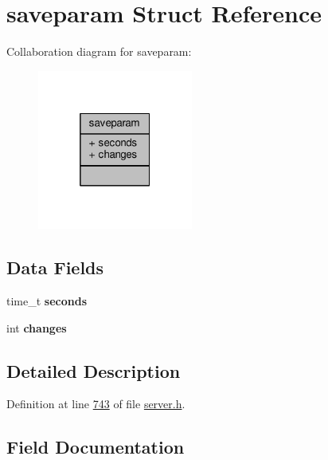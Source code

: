 \hypertarget{structsaveparam}{}\section{saveparam Struct Reference}
\label{structsaveparam}


Collaboration diagram for saveparam\+:\nopagebreak
\begin{figure}[H]
\begin{center}
\leavevmode
\includegraphics[width=145pt]{structsaveparam__coll__graph}
\end{center}
\end{figure}
\subsection*{Data Fields}
\begin{DoxyCompactItemize}
\item 
\mbox{\label{structsaveparam_af19a8ec632e45d50c08f9c4f641779c2}} 
time\+\_\+t {\bfseries seconds}
\item 
\mbox{\label{structsaveparam_af4b8df22183584608986533471082698}} 
int {\bfseries changes}
\end{DoxyCompactItemize}


\subsection{Detailed Description}


Definition at line \hyperlink{server_8h_source_l00743}{743} of file \hyperlink{server_8h_source}{server.\+h}.



\subsection{Field Documentation}
\mbox{\label{structsaveparam_af4b8df22183584608986533471082698}} 
